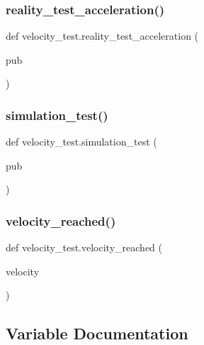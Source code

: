 \subsubsection{\texorpdfstring{reality\_test\_acceleration()}{reality\_test\_acceleration()}}
{\footnotesize\ttfamily def velocity\+\_\+test.\+reality\+\_\+test\+\_\+acceleration (\begin{DoxyParamCaption}\item[{}]{pub }\end{DoxyParamCaption})}

\mbox{\label{namespacevelocity__test_a3abe39643659ed5bf979398a5b0cec6d}} 
\subsubsection{\texorpdfstring{simulation\_test()}{simulation\_test()}}
{\footnotesize\ttfamily def velocity\+\_\+test.\+simulation\+\_\+test (\begin{DoxyParamCaption}\item[{}]{pub }\end{DoxyParamCaption})}

\mbox{\label{namespacevelocity__test_a125db86a88728cf91ab4383613e22cd1}} 
\subsubsection{\texorpdfstring{velocity\_reached()}{velocity\_reached()}}
{\footnotesize\ttfamily def velocity\+\_\+test.\+velocity\+\_\+reached (\begin{DoxyParamCaption}\item[{}]{velocity }\end{DoxyParamCaption})}



\subsection{Variable Documentation}
\mbox{\label{namespacevelocity__test_aff3865a893342d83613d51d6a735bffd}} 
